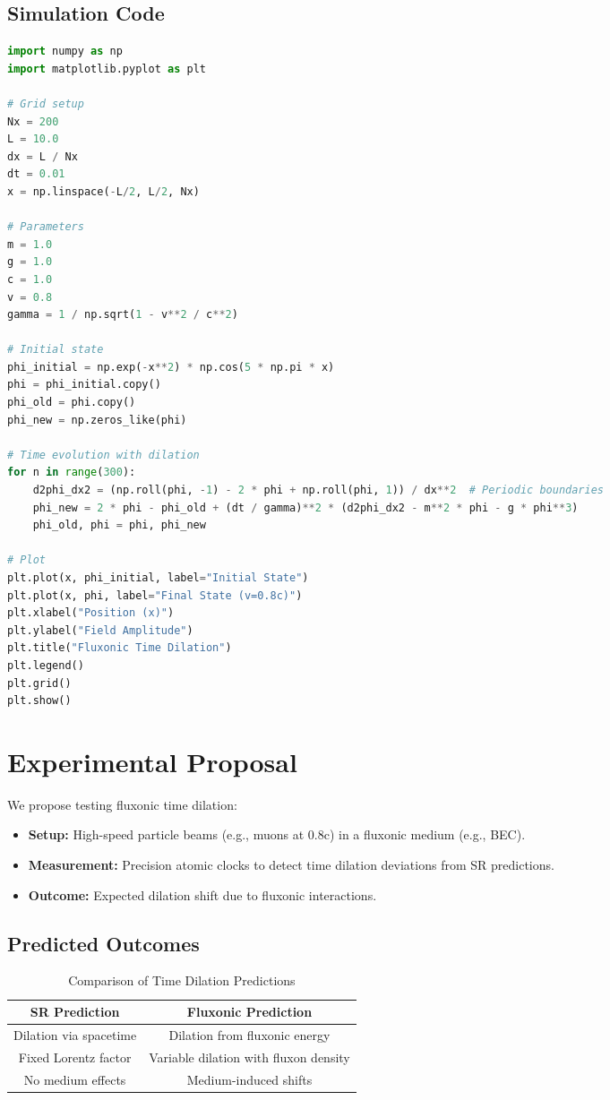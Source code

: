\documentclass{article}
\begin{document}
\subsection{Simulation Code}
\begin{lstlisting}[language=Python, caption=Fluxonic Time Dilation Simulation, label=lst:dilation]
import numpy as np
import matplotlib.pyplot as plt

# Grid setup
Nx = 200
L = 10.0
dx = L / Nx
dt = 0.01
x = np.linspace(-L/2, L/2, Nx)

# Parameters
m = 1.0
g = 1.0
c = 1.0
v = 0.8
gamma = 1 / np.sqrt(1 - v**2 / c**2)

# Initial state
phi_initial = np.exp(-x**2) * np.cos(5 * np.pi * x)
phi = phi_initial.copy()
phi_old = phi.copy()
phi_new = np.zeros_like(phi)

# Time evolution with dilation
for n in range(300):
    d2phi_dx2 = (np.roll(phi, -1) - 2 * phi + np.roll(phi, 1)) / dx**2  # Periodic boundaries
    phi_new = 2 * phi - phi_old + (dt / gamma)**2 * (d2phi_dx2 - m**2 * phi - g * phi**3)
    phi_old, phi = phi, phi_new

# Plot
plt.plot(x, phi_initial, label="Initial State")
plt.plot(x, phi, label="Final State (v=0.8c)")
plt.xlabel("Position (x)")
plt.ylabel("Field Amplitude")
plt.title("Fluxonic Time Dilation")
plt.legend()
plt.grid()
plt.show()
\end{lstlisting}

\section{Experimental Proposal}
We propose testing fluxonic time dilation:
\begin{itemize}
    \item \textbf{Setup:} High-speed particle beams (e.g., muons at 0.8c) in a fluxonic medium (e.g., BEC).
    \item \textbf{Measurement:} Precision atomic clocks to detect time dilation deviations from SR predictions.
    \item \textbf{Outcome:} Expected dilation shift due to fluxonic interactions.
\end{itemize}

\subsection{Predicted Outcomes}
\begin{table}[h]
    \centering
    \begin{tabular}{|c|c|}
        \hline
        \textbf{SR Prediction} & \textbf{Fluxonic Prediction} \\
        \hline
        Dilation via spacetime & Dilation from fluxonic energy \\
        Fixed Lorentz factor & Variable dilation with fluxon density \\
        No medium effects & Medium-induced shifts \\
        \hline
    \end{tabular}
    \caption{Comparison of Time Dilation Predictions}
    \label{tab:predictions}
\end{table}
\end{document}
